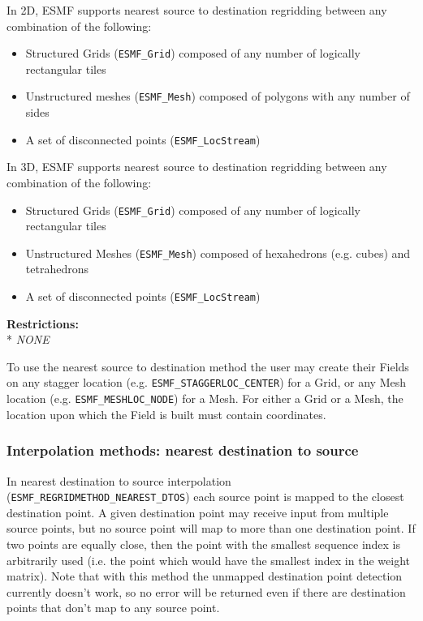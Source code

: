 \smallskip

 In 2D, ESMF supports nearest source to destination regridding between any combination of the following:
 \begin{itemize}
 \item Structured Grids ({\tt ESMF\_Grid}) composed of any number of logically rectangular tiles
 \item Unstructured meshes ({\tt ESMF\_Mesh}) composed of polygons with any number of sides
 \item A set of disconnected points ({\tt ESMF\_LocStream}) 
 \end{itemize}

\smallskip

 In 3D, ESMF supports nearest source to destination regridding between any combination of the following:
 \begin{itemize}
 \item Structured Grids ({\tt ESMF\_Grid}) composed of any number of logically rectangular tiles
 \item Unstructured Meshes ({\tt ESMF\_Mesh}) composed of hexahedrons (e.g. cubes) and tetrahedrons
 \item A set of disconnected points ({\tt ESMF\_LocStream}) 
 \end{itemize}

\smallskip

\textbf{Restrictions:}\\*
\textit{NONE}

\smallskip

 To use the nearest source to destination method the user may create their Fields on any stagger location (e.g. {\tt ESMF\_STAGGERLOC\_CENTER}) for a Grid, or
 any Mesh location (e.g. {\tt ESMF\_MESHLOC\_NODE}) for a Mesh. For either a Grid or a Mesh, the location upon which the Field is built 
 must contain coordinates. 


\subsubsection{Interpolation methods: nearest destination to source}\label{sec:interpolation:nearestdtos}
In nearest destination to source interpolation ({\tt ESMF\_REGRIDMETHOD\_NEAREST\_DTOS}) each source point is mapped to the closest destination point. A given destination point may receive input from multiple source points, but no source point will map to more than one destination point. If two points are equally close, then the point with the smallest sequence index is arbitrarily used (i.e. the point which would have the smallest index in the weight matrix). Note that with this method the unmapped destination point detection currently doesn't work, so no error will be returned even if there are destination points that don't map to any source point. 

